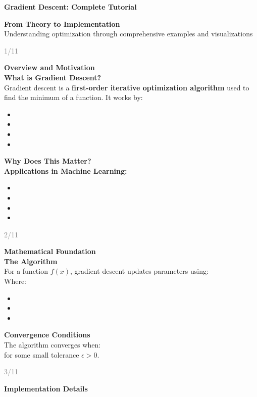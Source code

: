 \documentclass[11pt]{article}
\newcommand{\slidetitle}[1]{%
  \begin{center}
  \textcolor{accentcolor}{\huge\textbf{#1}}
  \end{center}
  \vspace{0.5cm}
}
\begin{document}
\slidetitle{Gradient Descent: Complete Tutorial}\n\n\textbf{\huge From Theory to Implementation}\\[0.5cm]
Understanding optimization through comprehensive examples and visualizations\n\n\vfill\n\begin{flushright}\n\textcolor{gray}{\small 1/11}\n\end{flushright}\n\n\newpage\n\n\textbf{\huge Overview and Motivation}\\[0.5cm]
\textbf{\Large What is Gradient Descent?}\\[0.3cm]
Gradient descent is a \textbf{first-order iterative optimization algorithm} used to find the minimum of a function. It works by:
\begin{itemize}
\item \1
\item \1
\item \1
\item \1
\end{itemize}
\textbf{\Large Why Does This Matter?}\\[0.3cm]
\textbf{Applications in Machine Learning:}
\begin{itemize}
\item \1
\item \1
\item \1
\item \1
\end{itemize}\n\n\vfill\n\begin{flushright}\n\textcolor{gray}{\small 2/11}\n\end{flushright}\n\n\newpage\n\n\textbf{\huge Mathematical Foundation}\\[0.5cm]
\textbf{\Large The Algorithm}\\[0.3cm]
For a function $f(x)$, gradient descent updates parameters using:
\\[\1\\]
Where:
\begin{itemize}
\item \1
\item \1
\item \1
\end{itemize}
\textbf{\Large Convergence Conditions}\\[0.3cm]
The algorithm converges when:
\\[\1\\]
for some small tolerance $\epsilon > 0$.\n\n\vfill\n\begin{flushright}\n\textcolor{gray}{\small 3/11}\n\end{flushright}\n\n\newpage\n\n\textbf{\huge Implementation Details}\\[0.5cm]
\end{document}
